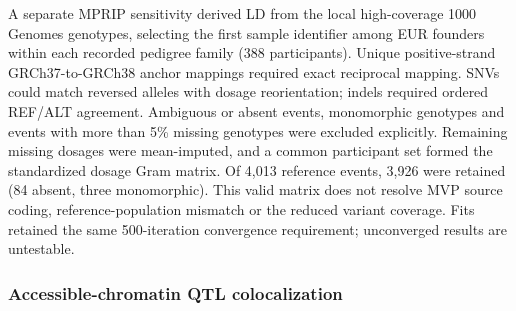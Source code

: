 A separate MPRIP sensitivity derived LD from the local high-coverage 1000
Genomes genotypes, selecting the first sample identifier among EUR founders
within each recorded pedigree family (388 participants). Unique positive-strand
GRCh37-to-GRCh38 anchor mappings required exact reciprocal mapping. SNVs could
match reversed alleles with dosage reorientation; indels required ordered
REF/ALT agreement. Ambiguous or absent events, monomorphic genotypes and events
with more than 5\% missing genotypes were excluded explicitly. Remaining missing
dosages were mean-imputed, and a common participant set formed the standardized
dosage Gram matrix. Of 4,013 reference events, 3,926 were retained (84 absent,
three monomorphic). This valid matrix does not resolve MVP source coding,
reference-population mismatch or the reduced variant coverage. Fits retained
the same 500-iteration convergence requirement; unconverged results are untestable.

\subsubsection{Accessible-chromatin QTL colocalization}\label{accessible-chromatin-qtl-colocalization}


